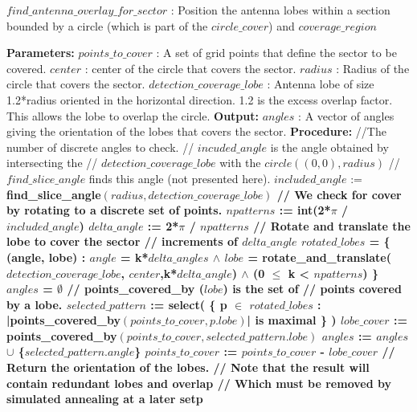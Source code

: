 \begin{algorithm}[!htb]
\caption{\textbf{$find\_antenna\_overlay\_for\_sector$} : Position the antenna lobes within a section bounded by a circle (which is part of the $circle\_cover$) and $coverage\_region$ }
\begin{algorithmic}
\State \textbf{Parameters:}
\State \tab $points\_to\_cover$ : A set of grid points that define the 
\State \tab \tab sector to be covered.
\State \tab $center$ : center of the circle that covers the sector.
\State \tab $radius$ : Radius of the circle that covers the sector.
\State \tab $detection\_coverage\_lobe$ : Antenna lobe of size 1.2*radius oriented 
\State \tab \tab in the horizontal direction. 1.2 is the excess overlap factor.
\State \tab \tab This allows the lobe to overlap the circle.  
\State \textbf{Output:}
\State \tab  $angles$ : A vector of angles giving the orientation of the 
\State \tab \tab lobes that covers the sector.
\State \textbf{Procedure:}
\State
\State //The number of discrete angles to check.
\State // $incuded\_angle$ is the angle obtained by intersecting the 
\State // $detection\_coverage\_lobe$ with the $circle((0,0),radius)$
\State // $find\_slice\_angle$ finds this angle (not presented here).
\State $included\_angle$ := \bf{find\_slice\_angle}$(radius,detection\_coverage\_lobe)$
\State // We check for cover by rotating to a discrete set of points.
\State $npatterns$ := \bf{int}(2*$\pi$ / $included\_angle$)
\State $delta\_angle$ := 2*$\pi$ / $npatterns$
\State // Rotate and translate the lobe to cover the sector 
\State // increments of $delta\_angle$
\State $rotated\_lobes$ = \{ (angle, lobe) :
\State \tab \tab \tab  $angle$ = k*$delta\_angles$ 
\State \tab \tab \tab  $\wedge$ $lobe$ = \bf{rotate\_and\_translate}($detection\_coverage\_lobe$,
\State \tab \tab \tab \tab \tab $center$,k*$delta\_angle$) 
\State \tab \tab  \tab $\wedge$ (0 $\le$ k < $npatterns$) \}
\State
\State $angles$ = $\emptyset$
\State // \bf{points\_covered\_by} ($lobe$) is the set of 
\State // points covered by a lobe.
\State $selected\_pattern$ := \bf{select}( \{ p $\in$ $rotated\_lobes$ : 
\State \tab \tab \tab |\bf{points\_covered\_by}$(points\_to\_cover,p.lobe)$| 
\State \tab \tab \tab \tab is maximal \} )
\State $lobe\_cover$ := \bf{points\_covered\_by}$(points\_to\_cover,selected\_pattern.lobe)$
\State $angles$ := $angles$  $\cup$ \{$selected\_pattern.angle$\}
\State $points\_to\_cover$ := $points\_to\_cover$ - $lobe\_cover$
\EndWhile
\State // Return the orientation of the lobes.
\State // Note that the result will contain redundant lobes and overlap 
\State // Which must be removed by simulated annealing at a later setp
\State {}
\end{algorithmic}
\end{algorithm}

